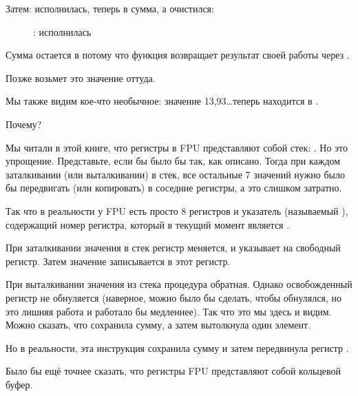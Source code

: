 \clearpage
Затем: \FADDP исполнилась, теперь в  сумма, а  очистился:

\begin{figure}[H]
\centering
{}
\caption{\olly: \FADDP исполнилась}
\label{fig:FPU_simple_olly_5}
\end{figure}

Сумма остается в  потому что функция возвращает результат своей работы через .

Позже \main возьмет это значение оттуда.

Мы также видим кое-что необычное: значение 13,93\ldots теперь находится в .

Почему?

\label{FPU_is_rather_circular_buffer}
Мы читали в этой книге, что регистры в \ac{FPU} представляют собой стек: . 
Но это упрощение.
Представьте, если бы  было бы так, как описано. Тогда при каждом заталкивании (или выталкивании) в стек,
все остальные 7 значений нужно было бы передвигать (или копировать) в соседние регистры, 
а это слишком затратно.

Так что в реальности у
\ac{FPU} есть просто 8 регистров и указатель (называемый ), содержащий номер регистра,
который в текущий момент является .

При заталкивании значения в стек регистр  меняется, и указывает на свободный регистр. 
Затем значение записывается в этот регистр.

При выталкивании значения из стека процедура обратная. Однако освобожденный регистр не обнуляется
(наверное, можно было бы сделать, чтобы обнулялся, но это лишняя работа и работало бы медленнее).
Так что это мы здесь и видим. 
Можно сказать, что \FADDP сохранила сумму, а затем вытолкнула один элемент.

Но в реальности, эта инструкция сохранила сумму и затем передвинула регистр .

Было бы ещё точнее сказать, что регистры \ac{FPU} представляют собой кольцевой буфер.

